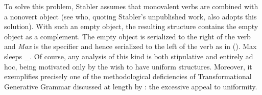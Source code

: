 \eal
{}
\zl
To solve this problem, Stabler assumes that monovalent verbs are combined with a nonovert object
(see \citet[, 124]{Veenstra98a} who, quoting Stabler's unpublished work, also adopts this
solution). 
With such an empty object, the resulting structure
contains the empty object as a complement. The empty object is serialized to the right of the verb
and \emph{Max} is the specifier and hence serialized to the left of the verb as in ().
\ea
\label{Beispiel-leeres-Element-intransitive-Verben}
Max sleeps \_.
\z
Of course, any analysis of this kind is both stipulative and
entirely ad hoc, being motivated only by the wish to have uniform
structures. Moreover, it exemplifies precisely one of the
methodological deficiencies of Transformational Generative Grammar discussed at length by
\citet[Section~2.1.2]{CJ2005a}: the excessive appeal to uniformity.

